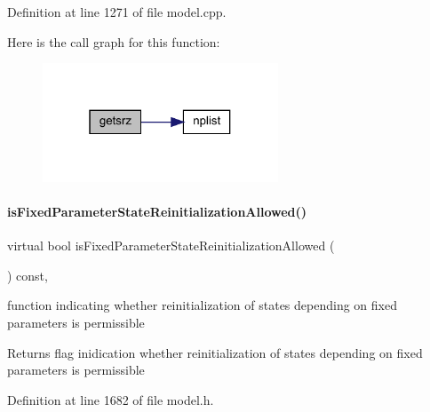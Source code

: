 Definition at line 1271 of file model.\+cpp.

Here is the call graph for this function\+:
\nopagebreak
\begin{figure}[H]
\begin{center}
\leavevmode
\includegraphics[width=199pt]{classamici_1_1_model_a49336e5923942fc5b4b26d6facf90b1d_cgraph}
\end{center}
\end{figure}
\mbox{\label{classamici_1_1_model_aee70a0075a3b36896dee7ba80415df3c}} 
\paragraph{\texorpdfstring{is\+Fixed\+Parameter\+State\+Reinitialization\+Allowed()}{isFixedParameterStateReinitializationAllowed()}}
{\footnotesize\ttfamily virtual bool is\+Fixed\+Parameter\+State\+Reinitialization\+Allowed (\begin{DoxyParamCaption}{ }\end{DoxyParamCaption}) const\hspace{0.3cm}{\ttfamily [protected]}, {\ttfamily [virtual]}}

function indicating whether reinitialization of states depending on fixed parameters is permissible \begin{DoxyReturn}{Returns}
flag inidication whether reinitialization of states depending on fixed parameters is permissible 
\end{DoxyReturn}


Definition at line 1682 of file model.\+h.

